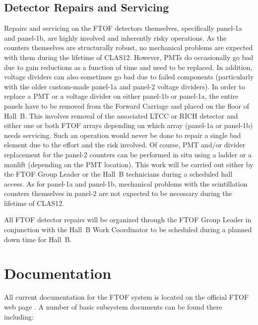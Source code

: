 \documentclass[12pt]{article}
\begin{document}
\subsection{Detector Repairs and Servicing}

Repairs and servicing on the FTOF detectors themselves, specifically panel-1a and 
panel-1b, are highly involved and inherently risky operations. As the counters 
themselves are structurally robust, no mechanical problems are expected with them 
during the lifetime of CLAS12. However, PMTs do occasionally go bad due to gain 
reductions as a function of time and need to be replaced. In addition, voltage 
dividers can also sometimes go bad due to failed components (particularly with the 
older custom-made panel-1a and panel-2 voltage dividers). In order to replace a PMT 
or a voltage divider on either panel-1b or panel-1a, the entire panels have to be 
removed from the Forward Carriage and placed on the floor of Hall~B. This involves 
removal of the associated LTCC or RICH detector and either one or both FTOF arrays 
depending on which array (panel-1a or panel-1b) needs servicing. Such an operation would
never be done to repair a single bad element due to the effort and the risk involved. Of
course, PMT and/or divider replacement for the panel-2 counters can be performed in situ
using a ladder or a manlift (depending on the PMT location). This work will be carried out 
either by the FTOF Group Leader or the Hall~B technicians during a scheduled hall 
access. As for panel-1a and panel-1b, mechanical problems with the scintillation 
counters themselves in panel-2 are not expected to be necessary during the lifetime 
of CLAS12.

All FTOF detector repairs will be organized through the FTOF Group Leader in 
conjunction with the Hall~B Work Coordinator to be scheduled during a planned down 
time for Hall~B.

\clearpage

\vfil
\eject

\section{Documentation}

All current documentation for the FTOF system is located on the official FTOF web page
\cite{ftof-web}. A number of basic subsystem documents can be found there including:
\end{document}
